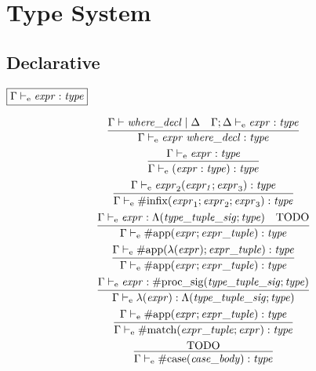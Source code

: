 \section{Type System}

\subsection{Declarative}

$\fbox{$\Gamma \vdash_\mathrm{e} \mathit{expr}: \mathit{type}$}$

\begin{gather*}
    \infer{\Gamma \vdash_\mathrm{e} \mathit{expr}\; \mathit{where\_decl}: \mathit{type}}{
        \Gamma \vdash \mathit{where\_decl} \mid \Delta
        &
        \Gamma; \Delta \vdash_\mathrm{e} \mathit{expr}: \mathit{type}
    }
    \\
    \infer{\Gamma \vdash_\mathrm{e} (\mathit{expr}: \mathit{type}): \mathit{type}}{
        \Gamma \vdash_\mathrm{e} \mathit{expr}: \mathit{type}
    }
    \\
    \infer{\Gamma \vdash_\mathrm{e} \mathrm{\#infix}(\mathit{expr}_1; \mathit{expr}_2; \mathit{expr}_3): \mathit{type}}{
        \Gamma \vdash_\mathrm{e} \mathit{expr}_2(\mathit{expr_1}; \mathit{expr}_3): \mathit{type}
    }
    \\
    \infer{\Gamma \vdash_\mathrm{e} \mathrm{\#app}(\mathit{expr}; \mathit{expr\_tuple}): \mathit{type}}{
        \Gamma \vdash_\mathrm{e} \mathit{expr}: \Lambda(\mathit{type\_tuple\_sig}; \mathit{type})
        &
        \text{TODO}
    }
    \\
    \infer{\Gamma \vdash_\mathrm{e} \mathrm{\#app}(\mathit{expr}; \mathit{expr\_tuple}): \mathit{type}}{
        \Gamma \vdash_\mathrm{e} \mathrm{\#app}(\lambda(\mathit{expr}); \mathit{expr\_tuple}): \mathit{type}
    }
    \\
    \infer{\Gamma \vdash_\mathrm{e} \lambda(\mathit{expr}): \Lambda(\mathit{type\_tuple\_sig}; \mathit{type})}{
        \Gamma \vdash_\mathrm{e} \mathit{expr}: \mathrm{\#proc\_sig}(\mathit{type\_tuple\_sig}; \mathit{type})
    }
    \\
    \infer{\Gamma \vdash_\mathrm{e} \mathrm{\#match}(\mathit{expr\_tuple}; \mathit{expr}): \mathit{type}}{
        \Gamma \vdash_\mathrm{e} \mathrm{\#app}(\mathit{expr}; \mathit{expr\_tuple}): \mathit{type}
    }
    \\
    \infer{\Gamma \vdash_\mathrm{e} \mathrm{\#case}(\mathit{case\_body}): \mathit{type}}{
        \text{TODO}
    }
    \\

\end{gather*}
